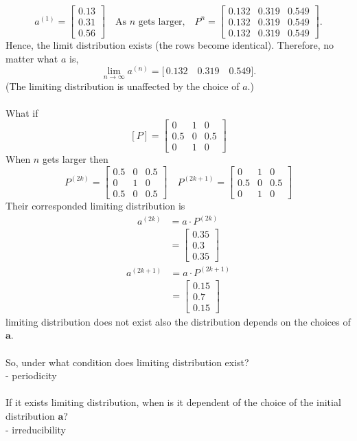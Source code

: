 \documentclass[12pt]{article}
\begin{document}
\[
a^{(1)} =
\begin{bmatrix}
0.13 \\
0.31 \\
0.56
\end{bmatrix}
\quad
\text{As } n \text{ gets larger,}
\quad
P^n =
\begin{bmatrix}
0.132 & 0.319 & 0.549 \\
0.132 & 0.319 & 0.549 \\
0.132 & 0.319 & 0.549
\end{bmatrix}.
\]
Hence, the limit distribution exists (the rows become identical). Therefore, no matter what \(a\) is,
\[
\lim_{n \to \infty} a^{(n)} =
\bigl[\,0.132 \quad 0.319 \quad 0.549\bigr].
\]
(The limiting distribution is unaffected by the choice of \(a\).)\\\\
What if \[
[P] = \begin{bmatrix}
    0 & 1& 0 \\
    0.5 & 0 &  0.5\\
    0 & 1 & 0
\end{bmatrix}
\]
When $n$ gets larger then
\[
P^{(2k)} =
\begin{bmatrix}
    0.5 & 0& 0.5 \\
    0 & 1 &  0\\
    0.5 & 0 & 0.5
\end{bmatrix}
\quad
P^{(2k+1)} =
\begin{bmatrix}
    0 & 1 &  0 \\
    0.5 & 0 & 0.5\\
    0 & 1 &  0
\end{bmatrix}
\]
Their corresponded limiting distribution is
\begin{align*}
    a^{(2k)} &= a \cdot P^{(2k)}\\
    &= \begin{bmatrix}
        0.35\\
        0.3\\
        0.35
    \end{bmatrix}
\end{align*}
\begin{align*}
    a^{(2k+1)} &= a \cdot P^{(2k+1)}\\
    &= \begin{bmatrix}
        0.15\\
        0.7\\
        0.15
    \end{bmatrix}
\end{align*}
limiting distribution does not exist also the distribution depends on the choices of $\textbf{a}$.\\\\
So, under what condition does limiting distribution exist?\\
- periodicity \\\\
If it exists limiting distribution, when is it dependent of the choice of the initial distribution $\textbf{a}$?\\
- irreducibility
\end{document}
